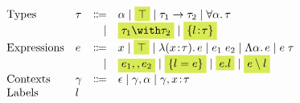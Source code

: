 \[
\begin{array}{l}
  \begin{array}{llrl}
    \text{Types} 
    & \tau & \Coloneqq & \alpha \mid \highlight{\top} \mid \tau_1 \to \tau_2 \mid \for \alpha \tau \\
    &      & \mid      & \highlight{\tau_1 \andop \tau_2} \mid \highlight{\recty l \tau} \\
    \text{Expressions} 
    & e & \Coloneqq & x \mid \highlight{\top} \mid \lam x \tau e \mid \app {e_1} {e_2} \mid \blam \alpha e \mid \tapp e \tau \\
    &   & \mid      & \highlight {e_1 \mergeop e_2} \mid \highlight {\reccon l e} \mid
                      \highlight {e.l} \mid \highlight{e \restrictop l} \\
    \text{Contexts} 
    & \gamma & \Coloneqq & \epsilon \mid \gamma, \alpha \mid \gamma, x \hast \tau \\
    \text{Labels} & l
  \end{array} 
\end{array}
\]
